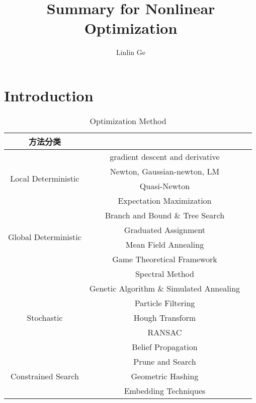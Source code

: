 \documentclass[10pt]{article}
\title{Summary for Nonlinear Optimization}
\author{Linlin Ge}
\date{}
\begin{document}
\maketitle

\section{Introduction}





\begin{table}[H]
\centering
\caption{Optimization Method}
\label{table1}
\begin{tabular}{|c|c|c|}
\hline  %
\multicolumn{1}{|c|}{方法分类}&  \\
\hline  %
\multirow{4}{*}{Local Deterministic}
 & gradient descent and derivative   \\
\cline{2-2}  %
~& Newton, Gaussian-newton, LM \\
\cline{2-2}  %
~& Quasi-Newton \\
\cline{2-2}  %
~& Expectation Maximization \\


\hline  %
\multirow{4}{*}{Global Deterministic}
 & Branch and Bound \& Tree Search   \\
\cline{2-2}  %
~& Graduated Assignment \\
\cline{2-2}  %
~& Mean Field Annealing \\
\cline{2-2}  %
~& Game Theoretical Framework \\
\cline{2-2}  %
~& Spectral Method \\

\hline  %
\multirow{5}{*}{Stochastic}
 & Genetic Algorithm \& Simulated Annealing   \\
\cline{2-2}  %
~& Particle Filtering \\
\cline{2-2}  %
~& Hough Transform \\
\cline{2-2}  %
~& RANSAC \\
\cline{2-2}  %
~& Belief Propagation \\

\hline  %
\multirow{3}{*}{Constrained Search}
 & Prune and Search   \\
\cline{2-2}  %
~& Geometric Hashing \\
\cline{2-2}  %
~& Embedding Techniques \\

\hline
\end{tabular}
\end{table}








\begin{thebibliography}{1}



\end{thebibliography}
\end{document}
